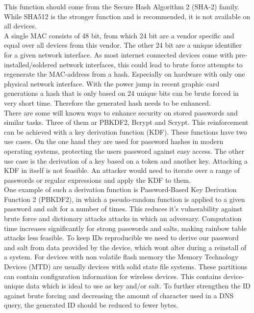         This function should come from the Secure Hash Algorithm 2 (SHA-2) family. While SHA512 is the stronger function and is recommended, it is not available on all devices.\\
        A single MAC consists of 48 bit, from which 24 bit are a vendor specific and equal over all devices from this vendor. The other 24 bit are a unique identifier for a given network interface. As most internet connected devices come with pre-installed/soldered network interfaces, this could lead to brute force attempts to regenerate the MAC-address from a hash. Especially on hardware with only one physical network interface. With the power jump in recent graphic card generations a hash that is only based on 24 unique bits can be brute forced in very short time. Therefore the generated hash needs to be enhanced.\\
        
        There are some will known ways to enhance security on stored passwords and similar tasks. Three of them ar PBKDF2, Bcrypt and Scrypt.
        This reinforcement can be achieved with a key derivation function (KDF). These functions have two use cases. On the one hand they are used for password hashes in modern operating systems, protecting the users password against easy access\cite{percival_stronger_nodate}. 
        The other use case is the derivation of a key based on a token and another key\cite{camenisch_privacy_2011}. Attacking a KDF in itself is not feasible. An attacker would need to iterate over a range of passwords or regular expressions and apply the KDF to them\cite{percival_stronger_nodate}.\\
        One example of such a derivation function is Password-Based Key Derivation Function 2 (PBKDF2), in which a pseudo-random function is applied to a given password and salt for a number of times. 
        This reduces it's vulnerability against brute force and dictionary attacks attacks in which an adversary\cite{kaliski_bkaliskirsasecuritycom_pkcs_2000}. 
        Computation time increases significantly for strong passwords and salts, making rainbow table attacks less feasible.
        To keep IDs reproducible we need to derive our password and salt from data provided by the device, which wont alter during a reinstall of a system. For devices with non volatile flash memory the Memory Technology Devices (MTD) are usually devices with solid state file systems\cite{giometti_mtd_2017}\cite{woodhouse_memory_nodate}. These partitions can contain configuration information for wireless devices. This contains device-unique data which is ideal to use as key and/or salt.
        To further strengthen the ID against brute forcing and decreasing the amount of character used in a DNS query, the generated ID should be reduced to fewer bytes.\\
        
